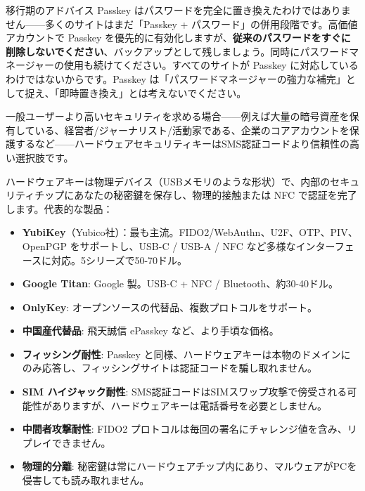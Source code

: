 \begin{tcbwarn}{移行期のアドバイス}
Passkey はパスワードを完全に置き換えたわけではありません——多くのサイトはまだ「Passkey + パスワード」の併用段階です。高価値アカウントで Passkey を優先的に有効化しますが、\textbf{従来のパスワードをすぐに削除しないでください}、バックアップとして残しましょう。同時にパスワードマネージャーの使用も続けてください。すべてのサイトが Passkey に対応しているわけではないからです。Passkey は「パスワードマネージャーの強力な補完」として捉え、「即時置き換え」とは考えないでください。

\end{tcbwarn}


一般ユーザーより高いセキュリティを求める場合——例えば大量の暗号資産を保有している、経営者/ジャーナリスト/活動家である、企業のコアアカウントを保護するなど——ハードウェアセキュリティキーはSMS認証コードより信頼性の高い選択肢です。


ハードウェアキーは物理デバイス（USBメモリのような形状）で、内部のセキュリティチップにあなたの秘密鍵を保存し、物理的接触または NFC で認証を完了します。代表的な製品：

\begin{itemize}
  \item \textbf{YubiKey}（Yubico社）：最も主流。FIDO2/WebAuthn、U2F、OTP、PIV、OpenPGP をサポートし、USB-C / USB-A / NFC など多様なインターフェースに対応。5シリーズで50-70ドル。
  \item \textbf{Google Titan}: Google 製。USB-C + NFC / Bluetooth、約30-40ドル。
  \item \textbf{OnlyKey}: オープンソースの代替品、複数プロトコルをサポート。
  \item \textbf{中国産代替品}: 飛天誠信 ePasskey など、より手頃な価格。
\end{itemize}


\begin{itemize}
  \item \textbf{フィッシング耐性}: Passkey と同様、ハードウェアキーは本物のドメインにのみ応答し、フィッシングサイトは認証コードを騙し取れません。
  \item \textbf{SIM ハイジャック耐性}: SMS認証コードはSIMスワップ攻撃で傍受される可能性がありますが、ハードウェアキーは電話番号を必要としません。
  \item \textbf{中間者攻撃耐性}: FIDO2 プロトコルは毎回の署名にチャレンジ値を含み、リプレイできません。
  \item \textbf{物理的分離}: 秘密鍵は常にハードウェアチップ内にあり、マルウェアがPCを侵害しても読み取れません。
\end{itemize}


